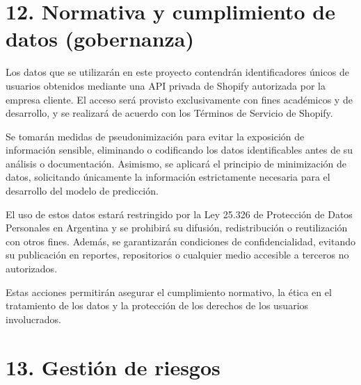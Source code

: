 \documentclass[
11pt, %
]{charter}
\begin{document}
\section{12. Normativa y cumplimiento de datos (gobernanza)}


Los datos que se utilizarán en este proyecto contendrán identificadores únicos de usuarios obtenidos mediante una API privada de Shopify autorizada por la empresa cliente. El acceso será provisto exclusivamente con fines académicos y de desarrollo, y se realizará de acuerdo con los Términos de Servicio de Shopify.

Se tomarán medidas de pseudonimización para evitar la exposición de información sensible, eliminando o codificando los datos identificables antes de su análisis o documentación. Asimismo, se aplicará el principio de minimización de datos, solicitando únicamente la información estrictamente necesaria para el desarrollo del modelo de predicción.

El uso de estos datos estará restringido por la Ley 25.326 de Protección de Datos Personales en Argentina y se prohibirá su difusión, redistribución o reutilización con otros fines. Además, se garantizarán condiciones de confidencialidad, evitando su publicación en reportes, repositorios o cualquier medio accesible a terceros no autorizados.

Estas acciones permitirán asegurar el cumplimiento normativo, la ética en el tratamiento de los datos y la protección de los derechos de los usuarios involucrados.



\section{13. Gestión de riesgos}
\label{sec:riesgos}
\end{document}
